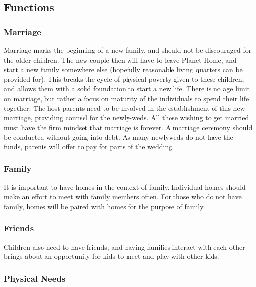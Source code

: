 \documentclass[CSHFoundation.tex]{subfiles}
\begin{document}
\subsection{Functions}



\subsubsection{Marriage}



Marriage marks the beginning of a new family, and should not be discouraged for the older children. The new couple then will have to leave Planet Home, and start a new family somewhere else (hopefully reasonable living quarters can be provided for). This breaks the cycle of physical poverty given to these children, and allows them with a solid foundation to start a new life. There is no age limit on marriage, but rather a focus on maturity of the individuals to spend their life together. The host parents need to be involved in the establishment of this new marriage, providing counsel for the newly-weds. All those wishing to get married must have the firm mindset that marriage is forever. A marriage ceremony should be conducted without going into debt. As many newlyweds do not have the funds, parents will offer to pay for parts of the wedding.



\subsubsection{Family}



It is important to have homes in the context of family. Individual homes should make an effort to meet with family members often. For those who do not have family, homes will be paired with homes for the purpose of family.



\subsubsection{Friends}



Children also need to have friends, and having families interact with each other brings about an opportunity for kids to meet and play with other kids.



\subsubsection{Physical Needs}
\end{document}
